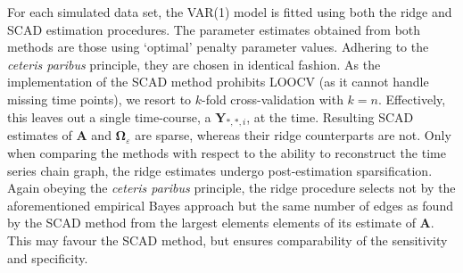 For each simulated data set, the VAR(1) model is fitted using both the  ridge and SCAD estimation procedures. The parameter estimates obtained from both methods are those using `optimal' penalty parameter values. Adhering to the \textit{ceteris paribus} principle, they are chosen in identical fashion. As the implementation of the SCAD method prohibits LOOCV (as it cannot handle missing time points), we resort to $k$-fold cross-validation with $k=n$. Effectively, this leaves out a single time-course, a $\mathbf{Y}_{\ast, \ast, i}$, at the time. 
Resulting SCAD estimates of $\mathbf{A}$ and $\boldsymbol{\Omega}_{\varepsilon}$ are sparse, whereas their ridge counterparts are not. Only when comparing the methods with respect to the ability to reconstruct the time series chain graph, the ridge estimates undergo post-estimation sparsification. Again obeying the \textit{ceteris paribus} principle, the ridge procedure selects not by the aforementioned empirical Bayes approach but the same number of edges as found by the SCAD method from the largest elements elements of its estimate of $\mathbf{A}$. This may favour the SCAD method, but ensures comparability of the sensitivity and specificity.



